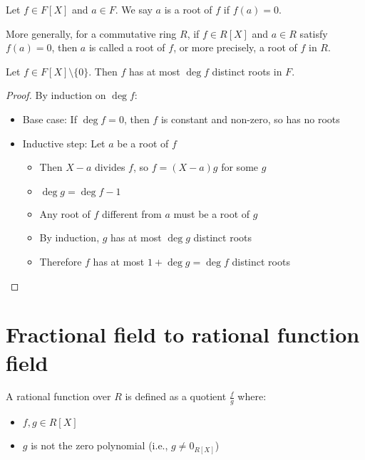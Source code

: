 \begin{definition}
  Let $f \in F[X]$ and $a \in F$. We say $a$ is a root of $f$ if $f(a) = 0$.

  More generally, for a commutative ring $R$, if $f \in R[X]$ and $a \in R$ satisfy $f(a) = 0$, then $a$ is called a root of $f$, or more precisely, a root of $f$ in $R$.
\end{definition}

\begin{proposition}
  Let $f \in F[X] \setminus \{0\}$. Then $f$ has at most $\deg f$ distinct roots in $F$.
\end{proposition}

\begin{proof}
  By induction on $\deg f$:
  \begin{itemize}
    \item Base case: If $\deg f = 0$, then $f$ is constant and non-zero, so has no roots

    \item Inductive step: Let $a$ be a root of $f$
      \begin{itemize}
        \item Then $X-a$ divides $f$, so $f = (X-a)g$ for some $g$
        \item $\deg g = \deg f - 1$
        \item Any root of $f$ different from $a$ must be a root of $g$
        \item By induction, $g$ has at most $\deg g$ distinct roots
        \item Therefore $f$ has at most $1 + \deg g = \deg f$ distinct roots
      \end{itemize}
  \end{itemize}
\end{proof}

\section{Fractional field to rational function field}

\begin{definition}
  A rational function over $R$ is defined as a quotient $\frac{f}{g}$ where:
  \begin{itemize}
    \item $f,g \in R[X]$
    \item $g$ is not the zero polynomial (i.e., $g \neq 0_{R[X]}$)
  \end{itemize}
\end{definition}

